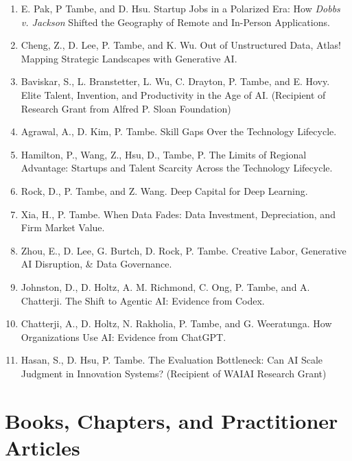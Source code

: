 \documentclass[10pt,letterpaper]{article}
\begin{document}
\begin{enumerate}[resume]
\item E. Pak, P Tambe, and D. Hsu.
  Startup Jobs in a Polarized Era: How \textit{Dobbs v. Jackson} Shifted the Geography of Remote and In-Person Applications.
\item Cheng, Z., D. Lee, P. Tambe, and K. Wu.
  Out of Unstructured Data, Atlas! Mapping Strategic Landscapes with Generative AI.
\item Baviskar, S., L. Branstetter, L. Wu, C. Drayton, P. Tambe, and E. Hovy. Elite Talent, Invention, and Productivity in the Age of AI. (Recipient of Research Grant from Alfred P. Sloan Foundation)
\item Agrawal, A., D. Kim, P. Tambe. Skill Gaps Over the Technology Lifecycle.
\item Hamilton, P., Wang, Z., Hsu, D., Tambe, P. The Limits of Regional Advantage: Startups and Talent Scarcity Across the Technology Lifecycle.
\item Rock, D., P. Tambe, and Z. Wang.
  Deep Capital for Deep Learning.
\item Xia, H., P. Tambe. When Data Fades: Data Investment, Depreciation, and Firm Market Value.
\item Zhou, E., D. Lee, G. Burtch, D. Rock, P. Tambe. Creative Labor, Generative AI Disruption, \& Data Governance.
\item Johnston, D., D. Holtz, A. M. Richmond, C. Ong, P. Tambe, and A. Chatterji.
  The Shift to Agentic AI: Evidence from Codex.
\item Chatterji, A., D. Holtz, N. Rakholia, P. Tambe, and G. Weeratunga.
  How Organizations Use AI: Evidence from ChatGPT.
\item Hasan, S., D. Hsu, P. Tambe. The Evaluation Bottleneck: Can AI Scale Judgment in Innovation Systems? (Recipient of WAIAI Research Grant)
\end{enumerate}

\section*{Books, Chapters, and Practitioner Articles}
\end{document}
